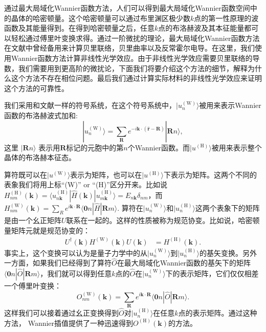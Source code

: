 通过最大局域化Wannier函数方法，人们可以得到最大局域化Wannier函数空间中的晶体的哈密顿量。这个哈密顿量可以通过布里渊区极少数$k$点的第一性原理的波函数及其能量得到。在得到哈密顿量之后，任意$k$点的布洛赫波及其本征能量都可以轻松通过傅里叶变换求得。通过一阶微扰的理论，最大局域化Wannier函数方法在文献中曾经备用来计算贝里联络，贝里曲率以及反常霍尔电导。在这里，我们使用Wannier函数方法计算非线性光学效应。由于非线性光学效应需要贝里联络的导数，我们需要用到更高阶的微扰论，下面我们将要介绍这个方法的细节，解释为什么这个方法不存在相位问题。最后我们通过计算实际材料的非线性光学效应来证明这个方法的可靠性。

我们采用和文献一样的符号系统，在这个符号系统中，$|u_{n}^{(\textrm{W})}\rangle$被用来表示Wannier函数的布洛赫波式加和: 
\[
|u_{n}^{(\textrm{W})}\rangle=\sum_{\mathbf{R}}e^{-i\mathbf{k}\cdot(\hat{\mathbf{r}}-\mathbf{R})}|\mathbf{R}n\rangle,
\]
这里 $|\mathbf{R}n\rangle$ 表示用$\mathbf{R}$标记的元胞中的第$n$个Wannier函数。而$|u^{(\textrm{H})}\rangle$被用来表示整个晶体的布洛赫本征态。

算符既可以在$|u^{(\textrm{W})}\rangle$表示为矩阵，也可以在$|u^{(\textrm{H})}\rangle$下表示为矩阵。这两个不同的表象我们将用上标``(W)'' or ``(H)''区分开来。比如说$H_{nm}^{(\textrm{H})}(\mathbf{k})=\langle u_{n\mathbf{k}}^{(\textrm{H})}|\hat{H}(\mathbf{k})|u_{m\mathbf{k}}^{(\textrm{H})}\rangle=E_{n\mathbf{k}}\delta_{nm}$，而 $H_{nm}^{(\textrm{W})}(\mathbf{k})=\sum_{R}e^{i\mathbf{k}\cdot\mathbf{R}}\langle\mathbf{0}n|\hat{H}|\mathbf{R}m\rangle$. 算符在$|u_{n}^{(\textrm{W})}\rangle$和$|u_{n}^{(\textrm{H})}\rangle$这两个表象下的矩阵是由一个幺正矩阵$U$联系在一起的。这样的性质被称为规范协变\cite{wang_textitab_2006}。比如说，哈密顿量矩阵元就是规范协变的：
\begin{align}
U^{\dagger}(\mathbf{k})H^{(\textrm{W})}(\mathbf{k})U(\mathbf{k}) & =H^{(\textrm{H})}(\mathbf{k}).\label{eq:H-w-H-h}
\end{align}
事实上，这个变换可以认为是量子力学中的从$|u_{n}^{(\textrm{W})}\rangle$到$|u_{n}^{(\textrm{H})}\rangle$的基矢变换。另外一方面，如果我们已经得到了算符$\hat{O}$在最大局域化Wannier函数的基矢下的矩阵$\langle\mathbf{0}n|\hat{O}|\mathbf{R}m\rangle$，我们就可以得到任意$k$点的$\hat{O}$在$|u_{n}^{(\textrm{W})}\rangle$下的表示矩阵，它们仅仅相差一个傅里叶变换：
\[
O_{nm}^{(\textrm{W})}(\mathbf{k})=\sum_{\mathbf{R}}e^{i\mathbf{k}\cdot\mathbf{R}}\langle\mathbf{0}n|\hat{O}|\mathbf{R}m\rangle.
\]
这样我们可以接着通过幺正变换得到$\hat{O}$对$|u_{n}^{(\textrm{H})}\rangle$在任意$k$点的表示矩阵。通过这种方法， Wannier插值提供了一种迅速得到$O^{(\textrm{H})}(\textbf{k})$的方法。

